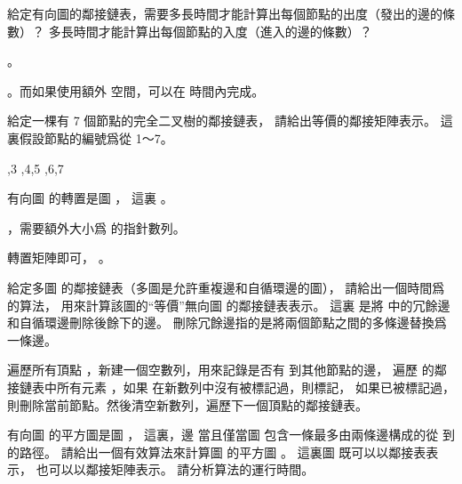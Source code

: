 \startsection[
  title={Representations of graphs},
]

\startEXERCISE
給定有向圖的鄰接鏈表，需要多長時間才能計算出每個節點的出度（發出的邊的條數）？
多長時間才能計算出每個節點的入度（進入的邊的條數）？
\stopEXERCISE

\startANSWER
{}。

。而如果使用額外  空間，可以在  時間內完成。
\stopANSWER

\startEXERCISE
給定一棵有 7 個節點的完全二叉樹的鄰接鏈表，
請給出等價的鄰接矩陣表示。
這裏假設節點的編號爲從 1～7。
\stopEXERCISE

\startANSWER
\startformulas
\startformula\startmathalignment
{} \NC {},3 \NR
{} \NC {},4,5 \NR
{} \NC {},6,7 \NR
{} \NC {} \NR
{} \NC {} \NR
{} \NC {} \NR
{} \NC {} \NR
\stopmathalignment\stopformula

\startformula\startmatrix
{}       \NR
{}       \NR
{}       \NR
{}       \NR
{}       \NR
{}       \NR
{}       \NR
\stopmatrix\stopformula
\stopformulas
\stopANSWER

\startEXERCISE
有向圖  的{\EMP 轉置}是圖 ，
這裏 。
\stopEXERCISE

\startANSWER
{}，需要額外大小爲  的指針數列。

轉置矩陣即可， 。
\stopANSWER

\startEXERCISE
給定多圖  的鄰接鏈表（多圖是允許重複邊和自循環邊的圖），
請給出一個時間爲  的算法，
用來計算該圖的“等價”無向圖  的鄰接鏈表表示。
這裏  是將  中的冗餘邊和自循環邊刪除後餘下的邊。
刪除冗餘邊指的是將兩個節點之間的多條邊替換爲一條邊。
\stopEXERCISE

\startANSWER
遍歷所有頂點 ，新建一個空數列，用來記錄是否有  到其他節點的邊，
遍歷  的鄰接鏈表中所有元素 ，如果  在新數列中沒有被標記過，則標記，
如果已被標記過，則刪除當前節點。然後清空新數列，遍歷下一個頂點的鄰接鏈表。
\stopANSWER

\startEXERCISE
有向圖  的{\EMP 平方圖}是圖 ，
這裏，邊  當且僅當圖  包含一條最多由兩條邊構成的從  到  的路徑。
請給出一個有效算法來計算圖  的平方圖 。
這裏圖  既可以以鄰接表表示，
也可以以鄰接矩陣表示。
請分析算法的運行時間。
\stopEXERCISE


